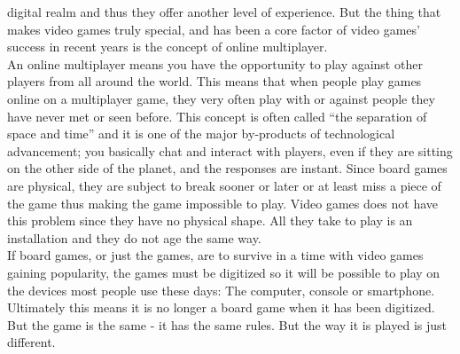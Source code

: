    digital realm and thus they offer another level of experience. But the
   thing that makes video games truly special, and has been a core factor
   of video games’ success in recent years is the concept of online
    multiplayer.\newline
\\
An online multiplayer means you have the opportunity to play against other
players from all around the world. This means that when people play games
online on a multiplayer game, they very often play with or against people
they have never met or seen before. This concept is often called
“the separation of space and time” and it is one of the major by-products
 of technological advancement; you basically chat and interact with players,
  even if they are sitting on the other side of the planet, and the responses
   are instant.
Since board games are physical, they are subject to break sooner or later or
at least miss a piece of the game thus making the game impossible to play.
 Video games does not have this problem since they have no physical shape.
 All they take to play is an installation and they do not age the same
 way. \newline
\\
If board games, or just the games, are to survive in a time with video games
gaining popularity, the games must be digitized so it will be possible to play
 on the devices most people use these days: The computer, console or
 smartphone. \newline
\\
Ultimately this means it is no longer a board game when it has been digitized.
 But the game is the same - it has the same rules. But the way it is played is
  just different.\newline
